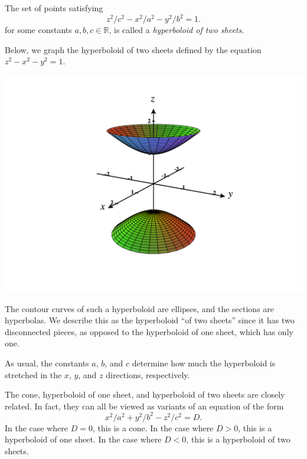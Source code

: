 \documentclass{ximera}
\begin{document}
\begin{example}
The set of points satisfying
\[
z^2/c^2 -x^2/a^2 - y^2/b^2 =1.
\]
for some constants $a,b,c\in\mathbb{R}$, is called a \emph{hyperboloid of two sheets}.

Below, we graph the hyperboloid of two sheets defined by the equation $z^2-x^2-y^2=1$.

\begin{image}
\includegraphics[width=\textwidth]{CalcPlot3D-hyperboloid2}
\end{image}

The contour curves of such a hyperboloid are ellipses, and the sections are hyperbolas. We describe this as the hyperboloid ``of two sheets'' since it has two disconnected pieces, as opposed to the hyperboloid of one sheet, which has only one.

As usual, the constants $a$, $b$, and $c$ determine how much the hyperboloid is stretched in the $x$, $y$, and $z$ directions, respectively.
\end{example}

The cone, hyperboloid of one sheet, and hyperboloid of two sheets are closely related. In fact, they can all be viewed as variants of an equation of the form
\[
x^2/a^2+y^2/b^2-z^2/c^2=D.
\]
In the case where $D=0$, this is a cone. In the case where $D>0$, this is a hyperboloid of one sheet. In the case where $D<0$, this is a hyperboloid of two sheets.
\end{document}
